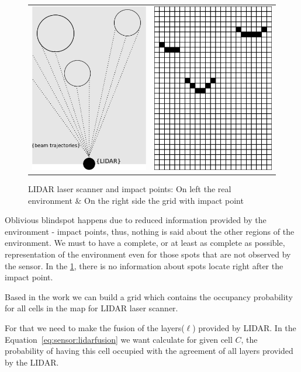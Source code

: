 \begin{figure}[h]
   \centering
     \begin{tabular}{lr}
       \includegraphics[width=0.3\columnwidth]{img/fig:motion:impactpoint:01}
       & \includegraphics[width=0.3\columnwidth]{img/fig:motion:impactpoint:02}
     \end{tabular}
   \caption{LIDAR laser scanner and impact points: On left the real environment \& On the right side the grid with impact point}
   \label{fig:motion:impactpoint}
 \end{figure}


Oblivious blindspot happens due to reduced information provided by the environment - impact points, thus, nothing is said about the other regions of the environment. We must to have a complete, or at least as complete as possible, representation of the environment even for those spots that are not observed by the sensor. In the \ref{fig:motion:impactpoint}, there is no information about spots locate right after the impact point.

Based in the work \cite{ADARVE-2012-671211} we can build a grid which contains the occupancy probability for all cells in the map for LIDAR laser scanner.

For that we need to make the fusion of the layers($\ell$) provided by LIDAR. In the Equation~\ref{eq:sensor:lidarfusion} we want calculate for given cell $C$, the probability of having this cell occupied with the agreement of all layers provided by the LIDAR.

